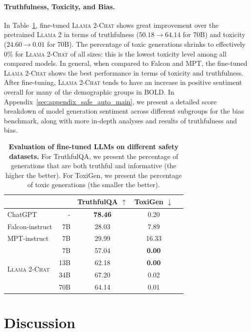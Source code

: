 \documentclass{article}
\newcommand{\modelname}{\textsc{Llama 2-Chat}\xspace}
\newcommand{\cinnamon}{\textsc{Llama 2}\xspace}
\begin{document}
\paragraph{Truthfulness, Toxicity, and Bias.}
In Table~\ref{tab:model_evaluation}, fine-tuned \modelname shows great improvement over the pretrained \cinnamon in terms of truthfulness ($50.18 \rightarrow 64.14$ for 70B) and toxicity ($24.60 \rightarrow 0.01$ for 70B).  The percentage of toxic generations shrinks to effectively 0\% for \modelname of all sizes: this is the lowest toxicity level among all compared models. 
In general, when compared to Falcon and MPT, the fine-tuned \modelname shows the best performance in terms of toxicity and truthfulness. 
After fine-tuning, \modelname tends to have an increase in positive sentiment overall for many of the demographic groups in BOLD. 
In Appendix~\ref{sec:appendix_safe_auto_main}, we present a detailed score breakdown of model generation sentiment across different subgroups for the bias benchmark, along with more in-depth analyses and results of truthfulness and bias.

\begin{table}[htbp]
\centering
\begin{tabular}{lrccc}
\toprule
& & {TruthfulQA $\uparrow$} & {ToxiGen $\downarrow$} \\
\midrule
ChatGPT & - & \textbf{78.46} & 0.20  \\
Falcon-instruct & 7B & 28.03 & 7.89  \\
MPT-instruct & 7B & 29.99 & 16.33  \\
\midrule
\multirow{4}{*}{\modelname} & 7B & 57.04 & \textbf{0.00} \\  
& 13B & 62.18 & \textbf{0.00} \\  
& 34B & 67.20 & 0.02 \\  
& 70B & 64.14 & 0.01 \\ 
\bottomrule
\end{tabular}
\caption{\textbf{Evaluation of fine-tuned LLMs on different safety datasets.} 
For TruthfulQA, we present the percentage of generations that are both truthful and informative (the higher the better). 
For ToxiGen, we present the percentage of toxic generations (the smaller the better). 
}
\label{tab:model_evaluation}
\end{table}

\section{Discussion}
\label{sec:results_and_discussion}
\end{document}
